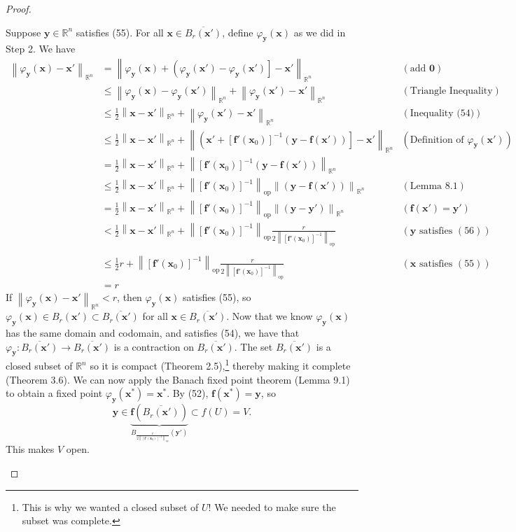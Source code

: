\documentclass{article}
\newcommand{\R}{\mathbb{R}}
\newcommand{\x}{\mathbf{x}}
\newcommand{\f}{\mathbf{f}}
\newcommand{\y}{\mathbf{y}}
\newcommand{\ze}{\mathbf{0}}
\newcommand{\norm}[1]{\left\lVert#1\right\rVert}
\newcommand{\normop}[1]{\left\lVert#1\right\rVert_\text{op}}
\theoremstyle{definition}
\begin{document}
\begin{proof}
\begin{enumerate}
			
			Suppose $ \y\in \R^n $ satisfies (55). For all $ \x\in\overline{B_r(\x')}  $, define $ \varphi_{\y}(\x) $ as we did in Step 2. We have 
			\begin{align*}
				\norm{\varphi_{\y}(\x) - \x'}_{\R^n}& =	\norm{\varphi_{\y}(\x) + \left(\varphi_{\y}(\x') -\varphi_{\y}(\x') \right]  - \x'}_{\R^n} & (\text{add }\ze)\\ 
				& \le \norm{\varphi_{\y}(\x) - \varphi_{\y}(\x')}_{\R^n}  + \norm{\varphi_{\y}(\x')  - \x'}_{\R^n} & (\text{Triangle Inequality})\\ & 
				\le \frac{1}{2}\norm{\x-\x'}_{\R^n} + \norm{\varphi_\y(\x')  - \x'}_{\R^n} & (\text{Inequality (54)})\\
				& 
				\le \frac{1}{2}\norm{\x-\x'}_{\R^n} + \norm{\left(\x' + [\f'(\x_0)]^{-1}(\y - \f(\x'))\right] - \x'}_{\R^n} & (\text{Definition of }\varphi_{\y}(\x')) \\ & = 	 \frac{1}{2}\norm{\x-\x'}_{\R^n} + \norm{ [\f'(\x_0)]^{-1}(\y - \f(\x'))}_{\R^n} \\ &\le  \frac{1}{2}\norm{\x-\x'}_{\R^n} + \normop{[\f'(\x_0)]^{-1}}\norm{(\y - \f(\x'))}_{\R^n} & (\text{Lemma 8.1}) \\
				&=  \frac{1}{2}\norm{\x-\x'}_{\R^n} + \normop{[\f'(\x_0)]^{-1}}\norm{(\y - \y')}_{\R^n} & (\f(\x')=\y') \\
				& < \frac{1}{2}\norm{\x-\x'}_{\R^n} + \normop{[\f'(\x_0)]^{-1}}\frac{r}{2\normop{[\f'(\x_0)]^{-1}}} & (\y\text{ satisfies }(56))\\ \\
				& \le \frac{1}{2}r+ \normop{[\f'(\x_0)]^{-1}}\frac{r}{2\normop{[\f'(\x_0)]^{-1}}} & (\x\text{ satisfies }(55))\\ & = r
			\end{align*}
			If $ \norm{\varphi_{\y}(\x) - \x'}_{\R^n} <r$, then $ \varphi_{\y}(\x)  $ satisfies (55), so $ \varphi_{\y}(\x)\in B_r(\x') \subset \overline{B_r(\x')}   $ for all $ \x\in\overline{B_r(\x')} $. Now that we know $ \varphi_\y(\x) $ has the same domain and codomain, and satisfies (54), we have that $ \varphi_{\y}:\overline{B_r(\x')} \to \overline{B_r(\x')}  $ is a contraction on $ \overline{B_r(\x')}  $. The set $ \overline{B_r(\x')} $ is a closed subset of $ \R^n $ so it is compact (Theorem 2.5),\footnote{This is why we wanted a closed subset of $U$! We needed to make sure the subset was complete.} thereby making it complete (Theorem 3.6). We can now apply the Banach fixed point theorem (Lemma 9.1) to obtain a fixed point $ \varphi_\y(\x^*)=\x^* $. By (52), $ \f(\x^*)=\y $, so $$ \y\in \underbrace{\f\left(\overline{B_r(\x')}\right) }_{B_{\frac{r}{2\normop{[\f'(\x_0)]^{-1}}}}(\y')}\subset f(U)=V .$$ This makes $ V $ open.

\end{enumerate}
\end{proof}
\end{document}
